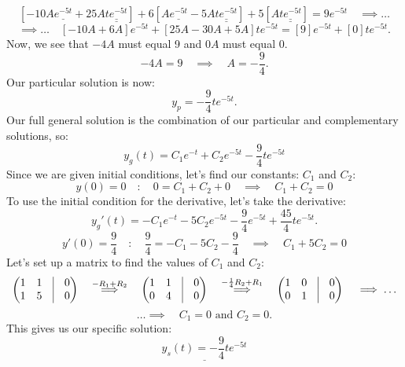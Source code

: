 \documentclass[a4paper,12pt]{article} %
\begin{document}
$$\left[-10A\underline{e^{-5t}} + 25A\underline{\underline{te^{-5t}}}\right] + 6\left[A\underline{e^{-5t}} - 5A\underline{\underline{te^{-5t}}}\right] + 5\left[A\underline{\underline{te^{-5t}}}\right] = 9e^{-5t} \quad\implies\ldots$$
$$ \implies\ldots\quad [-10A + 6A]e^{-5t} + [25A -30A + 5A]te^{-5t} = [9]e^{-5t} + [0]te^{-5t}. $$
Now, we see that $-4A$ must equal 9 and $0A$ must equal 0.
$$ -4A=9 \quad\implies\quad A = -\frac{9}{4}.$$
Our particular solution is now:
$$ y_p = -\frac{9}{4}te^{-5t}. $$
Our full general solution is the combination of our particular and complementary solutions, so:
$$ \boxed{y_g(t) = C_1e^{-t} + C_2e^{-5t} -\frac{9}{4}te^{-5t}}  $$
Since we are given initial conditions, let's find our constants: $C_1$ and $C_2$:
$$ y(0)=0 \quad:\quad 0=C_1 + C_2 + 0 \quad\implies\quad \boxed{C_1 + C_2 = 0} $$
To use the initial condition for the derivative, let's take the derivative:
$$ y_g'(t) = -C_1e^{-t} -5C_2e^{-5t} -\frac{9}{4}e^{-5t} +\frac{45}{4}te^{-5t}. $$
$$ y'(0) = \frac{9}{4} \quad:\quad \frac{9}{4} = -C_1 -5C_2 - \frac{9}{4} \quad\implies\quad \boxed{C_1 + 5C_2 = 0} $$
Let's set up a matrix to find the values of $C_1$ and $C_2$:
$$
\left(\begin{matrix}
	1 & 1 & \vline & 0 \\
	1 & 5 & \vline & 0
\end{matrix}\right)
\quad\overset{-R_1 + R_2}\implies\quad
\left(\begin{matrix}
	1 & 1 & \vline & 0 \\
	0 & 4 & \vline & 0
\end{matrix}\right)
\quad\overset{-\frac{1}{4}R_2 + R_1}\implies\quad
\left(\begin{matrix}
	1 & 0 & \vline & 0 \\
	0 & 1 & \vline & 0
\end{matrix}\right) \quad\implies\ldots
 $$
 $$ \ldots\implies\quad C_1=0 \text{ and } C_2=0. $$
 This gives us our specific solution:
 $$ \underline{\boxed{y_s(t) = -\frac{9}{4}te^{-5t}}} $$
\end{document}
